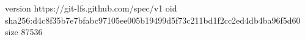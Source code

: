 version https://git-lfs.github.com/spec/v1
oid sha256:d4c8f35b7e7bfabc97105ee005b19499d5f73c211bd1f2cc2ed4db4ba96f5d60
size 87536
